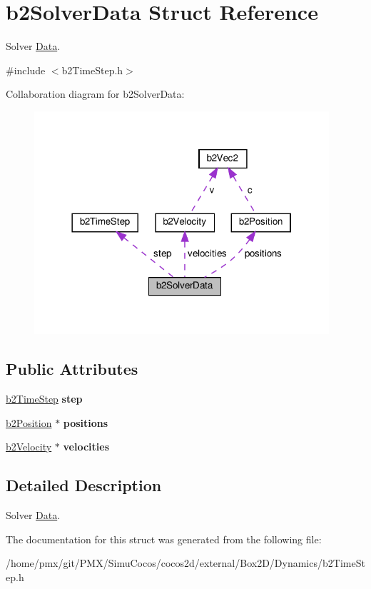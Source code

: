 \hypertarget{structb2SolverData}{}\section{b2\+Solver\+Data Struct Reference}
\label{structb2SolverData}


Solver \hyperlink{classData}{Data}.  




{\ttfamily \#include $<$b2\+Time\+Step.\+h$>$}



Collaboration diagram for b2\+Solver\+Data\+:
\nopagebreak
\begin{figure}[H]
\begin{center}
\leavevmode
\includegraphics[width=310pt]{structb2SolverData__coll__graph}
\end{center}
\end{figure}
\subsection*{Public Attributes}
\begin{DoxyCompactItemize}
\item 
\mbox{\label{structb2SolverData_a99998296de1b4f128c396def56392eea}} 
\hyperlink{structb2TimeStep}{b2\+Time\+Step} {\bfseries step}
\item 
\mbox{\label{structb2SolverData_a53269a6e6c2081e89d1a264429a873f1}} 
\hyperlink{structb2Position}{b2\+Position} $\ast$ {\bfseries positions}
\item 
\mbox{\label{structb2SolverData_a265c4d8aa45dd7f26402e841935e77f5}} 
\hyperlink{structb2Velocity}{b2\+Velocity} $\ast$ {\bfseries velocities}
\end{DoxyCompactItemize}


\subsection{Detailed Description}
Solver \hyperlink{classData}{Data}. 

The documentation for this struct was generated from the following file\+:\begin{DoxyCompactItemize}
\item 
/home/pmx/git/\+P\+M\+X/\+Simu\+Cocos/cocos2d/external/\+Box2\+D/\+Dynamics/b2\+Time\+Step.\+h\end{DoxyCompactItemize}
